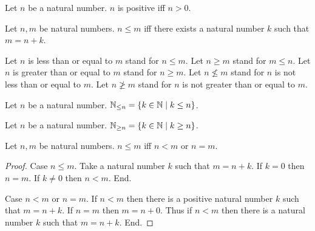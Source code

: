 \documentclass[../arithmetic.tex]{subfiles}
\begin{document}
  \begin{forthel}
    \begin{definition}
      Let $n$ be a natural number.
      $n$ is positive iff $n > 0$.
    \end{definition}
  \end{forthel}

  \begin{forthel}
    \begin{definition}
      Let $n, m$ be natural numbers.
      $n \leq m$ iff there exists a natural number $k$ such that $m = n + k$.
    \end{definition}

    Let $n$ is less than or equal to $m$ stand for $n \leq m$.
    Let $n \geq m$ stand for $m \leq n$.
    Let $n$ is greater than or equal to $m$ stand for $n \geq m$.
    Let $n \nleq m$ stand for $n$ is not less than or equal to $m$.
    Let $n \ngeq m$ stand for $n$ is not greater than or equal to $m$.
  \end{forthel}

  \begin{forthel}
    \begin{definition}
      Let $n$ be a natural number.
      $\mathbb{N}_{\leq n} = \{ k \in \mathbb{N} \mid k \leq n \}$.
    \end{definition}
  \end{forthel}

  \begin{forthel}
    \begin{definition}
      Let $n$ be a natural number.
      $\mathbb{N}_{\geq n} = \{ k \in \mathbb{N} \mid k \geq n \}$.
    \end{definition}
  \end{forthel}

  \begin{forthel}
    \begin{proposition}
      Let $n, m$ be natural numbers.
      $n \leq m$ iff $n < m$ or $n = m$.
    \end{proposition}
    \begin{proof}
      Case $n \leq m$.
        Take a natural number $k$ such that $m = n + k$.
        If $k = 0$ then $n = m$. If $k \neq 0$ then $n < m$.
      End.

      Case $n < m$ or $n = m$.
        If $n < m$ then there is a positive natural number $k$ such that
        $m = n + k$.
        If $n = m$ then $m = n + 0$.
        Thus if $n < m$ then there is a natural number $k$ such that
        $m = n + k$.
      End.
    \end{proof}
  \end{forthel}
\end{document}
